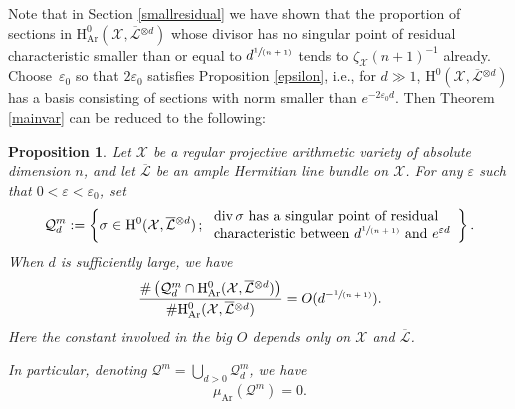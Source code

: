 \documentclass[11pt]{article}
\newcommand{\ie}{i.e.,\xspace}
\numberwithin{equation}{section}
\newcommand{\spfrac}[2]{\sfrac{#1}{(#2)}}
\let\epsilon\varepsilon
\newcommand{\sep}{\,;\,}
\theoremstyle{plain}
\newtheorem{prop}[thm]{Proposition}
\theoremstyle{definition}
\newcommand{\ho}{\mathrm{H}}
\newcommand{\X}{\mathcal{X}}
\newcommand{\Li}{\overline{\mathcal{L}}{}}
\begin{document}
Note that in Section \ref{smallresidual} we have shown that the proportion of sections in $\ho_{\mathrm{Ar}}^0(\X,\Li^{\otimes d})$ whose divisor has no singular point of residual characteristic smaller than or equal to $d^{\spfrac{1}{n+1}}$ tends to $\zeta_\X(n+1)^{-1}$ already. Choose~$\varepsilon_0$ so that $2\varepsilon_0$ satisfies Proposition \ref{epsilon}, \ie for $d\gg 1$, $\ho^0(\X,\Li{}^{\otimes d})$ has a basis consisting of sections with norm smaller than $e^{-2\varepsilon_0 d}$. Then Theorem \ref{mainvar} can be reduced to the following:
\begin{prop}\label{medsing}
Let $\X$ be a regular projective arithmetic variety of absolute dimension $n$, and let $\Li$ be an ample Hermitian line bundle on $\X$. For any $\varepsilon$ such that $0<\varepsilon<\epsilon_0$, set
\[
\mathcal{Q}_{d}^m:=\left\{ \sigma\in \ho^0(\X,\Li^{\otimes d})\sep \begin{array}{ll}
\div \sigma \text{ has a singular point of residual} \\
\text{characteristic between } d^{\spfrac{1}{n+1}} \text{ and } e^{\varepsilon d}
\end{array}\right\}.
\]
When $d$ is sufficiently large, we have
\[
\frac{\#\left(\mathcal{Q}_{d}^m\cap \ho^0_{\mathrm{Ar}}(\X, \overline{\mathcal{L}}{}^{\otimes d})\right)}{\#\ho^0_{\mathrm{Ar}}(\X, \overline{\mathcal{L}}{}^{\otimes d})} = O(d^{-\spfrac{1}{n+1}}).
\]
Here the constant involved in the big $O$ depends only on $\X$ and $\Li$.

In particular, denoting $\mathcal{Q}^m=\bigcup_{d>0}\mathcal{Q}_{d}^m$, we have
\[
\mu_{\mathrm{Ar}}(\mathcal{Q}^m)=0.
\]
\end{prop}
\end{document}

